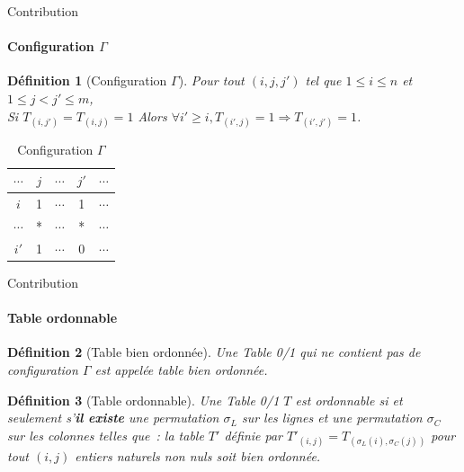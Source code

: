 \documentclass{beamer}
\newtheorem{de}{Définition}
\begin{document}
  \begin{frame}{Contribution}
  \framesubtitle{Configuration $\Gamma$}
  \begin{de}[Configuration $\Gamma$]
  Pour tout $(i, j, j')$ tel que $1 \leq i \leq n$ et $1 \leq j < j' \leq m$,\\
  Si $T_{(i, j')} = T_{(i, j)} = 1$ Alors $\forall i'\geqslant i, T_{(i', j)} = 1 \Rightarrow T_{(i', j')} = 1$.
  \end{de}

  \begin{table}[htb]
  \centering
  \begin{tabular}{*{4}{c|} c}
  
	$\cdots$ & $j$ & $\cdots$ & $j'$ & $\cdots$\\
  \hline
	$i$ & 1 & $\cdots$ & 1 & $\cdots$\\
  \hline
	$\cdots$ & * & $\cdots$ & * & $\cdots$\\
  \hline
	$i'$ & 1 & $\cdots$ & 0 & $\cdots$
  \end{tabular}
  \caption{Configuration $\Gamma$}
  \label{gammma}
  \end{table}
  \end{frame}

  \begin{frame}{Contribution}
  \framesubtitle{Table ordonnable}
  \begin{de}[Table bien ordonnée]
  Une Table 0/1 qui ne contient pas de configuration $\Gamma$ est appelée
  table \textit{bien ordonnée}.
  \end{de}

  \begin{de}[Table ordonnable]
  Une Table 0/1 $T$ est \textit{ordonnable} si et seulement s'\textbf{il existe} une permutation $\sigma_L$ sur les lignes 
  et une permutation $\sigma_C$ sur les colonnes telles que~:
  la table $T'$ définie par $T'_{(i, j)} = T_{(\sigma_L(i), \sigma_C(j))}$ pour tout $(i, j)$ entiers naturels 
  non nuls soit bien ordonnée.
  \end{de}
  \end{frame}
\end{document}

